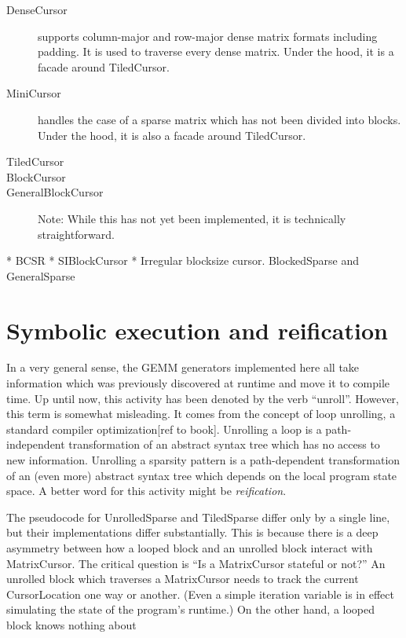     \begin{description}
        \item[DenseCursor] supports column-major and row-major dense matrix formats including padding. It is used to traverse every dense matrix. Under the hood, it is a facade around TiledCursor.

        \item[MiniCursor] handles the case of a sparse matrix which has not been divided into blocks. Under the hood, it is also a facade around TiledCursor.

        \item[TiledCursor] 

        \item[BlockCursor]
        \item[GeneralBlockCursor] Note: While this has not yet been implemented, it is technically straightforward.
    \end{description}

    * BCSR
    * SIBlockCursor
    * Irregular blocksize cursor. BlockedSparse and GeneralSparse



\section{Symbolic execution and reification}


In a very general sense, the GEMM generators implemented here all take information which was previously discovered at runtime and move it to compile time. Up until now, this activity has been denoted by the verb ``unroll''. However, this term is somewhat misleading. It comes from the concept of loop unrolling, a standard compiler optimization[ref to book]. Unrolling a loop is a path-independent transformation of an abstract syntax tree which has no access to new information. Unrolling a sparsity pattern is a path-dependent transformation of an (even more) abstract syntax tree which depends on the local program state space. A better word for this activity might be \emph{reification}. 

The pseudocode for UnrolledSparse and TiledSparse differ only by a single line, but their implementations differ substantially. This is because there is a deep asymmetry between how a looped block and an unrolled block interact with MatrixCursor. The critical question is ``Is a MatrixCursor stateful or not?'' An unrolled block which traverses a MatrixCursor needs to track the current CursorLocation one way or another. (Even a simple iteration variable is in effect simulating the state of the program's runtime.) On the other hand, a looped block knows nothing about

